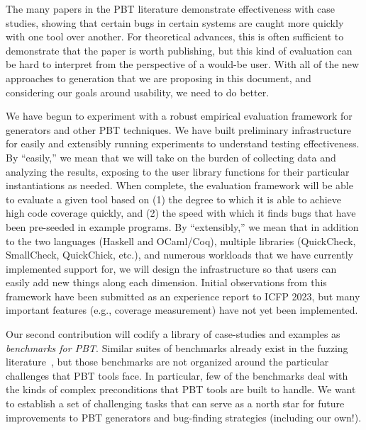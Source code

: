 
The many papers in the PBT literature demonstrate effectiveness with case
studies, showing that certain bugs in certain systems are caught more quickly
with one tool over another. For theoretical advances, this is often sufficient
to demonstrate that the paper is worth publishing, but this kind of evaluation
can be hard to interpret from the perspective of a would-be user. With all of
the new approaches to generation that we are proposing in this document, and
considering our goals around usability, we need to do better.

We have begun to experiment with a robust empirical evaluation framework for
generators and other PBT techniques. We have built preliminary infrastructure 
for easily and extensibly running experiments to understand testing
effectiveness.  By ``easily,'' we mean that we will take on the burden of
collecting data and analyzing the results, exposing to the user library
functions for their particular instantiations as needed.  When complete, the
evaluation framework will be able to evaluate a given tool based on (1) the
degree to which it is able to achieve high code coverage quickly, and (2) the
speed with which it finds bugs that have been pre-seeded in example programs. By
``extensibly,'' we mean that in addition to the two languages (Haskell and
OCaml/Coq), multiple libraries (QuickCheck, SmallCheck, QuickChick, etc.), and
numerous workloads that we have currently implemented support for, we will design the
infrastructure so that users can easily add new things along each dimension.
Initial observations from this framework have been submitted as an experience
report to ICFP 2023, but many important features (e.g., coverage measurement) have not yet
been implemented.

Our second contribution will codify a library of case-studies and examples as
{\em benchmarks for PBT}. Similar suites of benchmarks already exist in the
fuzzing literature~\cite{hazimeh_magma_2021}, but those benchmarks are not
organized around the particular challenges that PBT tools face. In particular,
few of the benchmarks deal with the kinds of complex preconditions that PBT
tools are built to handle. We want to establish a set of challenging tasks that
can serve as a north star for future improvements to PBT generators and
bug-finding strategies (including our own!).

